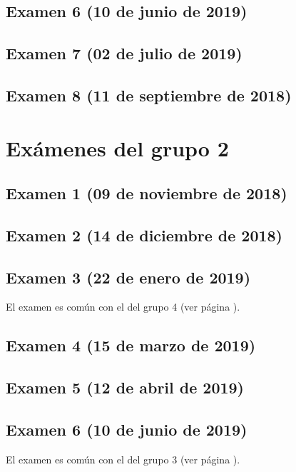 \documentclass[a4paper,12pt,twoside]{book}
\begin{document}
\section{Examen 6 (10 de junio de 2019)}
 \label{examen_18_19_1_6}
\section{Examen 7 (02 de julio de 2019)}
 \label{examen_18_19_1_7}
\section{Examen 8 (11 de septiembre de 2018)}
 \label{examen_18_19_1_8}
        
\chapter{Exámenes del grupo 2}
\section{Examen 1 (09 de noviembre de 2018)}
\section{Examen 2 (14 de diciembre de 2018)}
\section{Examen 3 (22 de enero de 2019)}
El examen es común con el del grupo 4 (ver página \pageref{examen_18_19_4_3}).
\section{Examen 4 (15 de marzo de 2019)}
\section{Examen 5 (12 de abril de 2019)}
\section{Examen 6 (10 de junio de 2019)}
El examen es común con el del grupo 3 (ver página \pageref{examen_18_19_3_6}).
\end{document}
